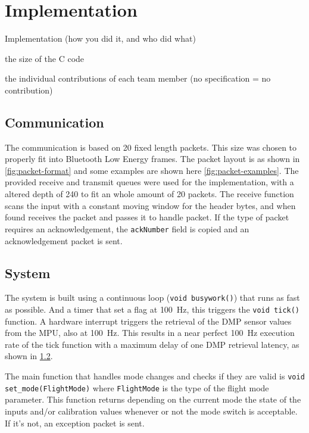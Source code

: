 \documentclass[final]{article}
\begin{document}
\section{Implementation}
\label{sec:implmentation}
Implementation (how you did it, and who did what)

the size of the C code

the individual contributions of each team member (no specification = no contribution)


\subsection{Communication}
The communication is based on \SI{20}{\byte} fixed length packets.
This size was chosen to properly fit into Bluetooth Low Energy frames.
The packet layout is as shown in \cref{fig:packet-format} and some examples are shown here \cref{fig:packet-examples}. %
The provided receive and transmit queues were used for the implementation, with a altered depth of \num{240} to fit an whole amount of \SI{20}{\byte} packets.
The receive function scans the input with a constant moving window for the header bytes, and when found receives the packet and passes it to handle packet.
If the type of packet requires an acknowledgement, the \texttt{ackNumber} field is copied and an acknowledgement packet is sent.


\subsection{System}
The system is built using a continuous loop (\texttt{void busywork()}) that runs as fast as possible.
And a timer that set a flag at \SI{100}{\hertz}, this triggers the \texttt{void tick()} function.
A hardware interrupt triggers the retrieval of the DMP sensor values from the MPU, also at \SI{100}{\hertz}.
This results in a near perfect \SI{100}{\hertz} execution rate of the tick function with a maximum delay of one DMP retrieval latency, as shown in \cref{}. %

The main function that handles mode changes and checks if they are valid is \texttt{void set\_mode(FlightMode)} where \texttt{FlightMode} is the type of the flight mode parameter.
This function returns depending on the current mode the state of the inputs and/or calibration values whenever or not the mode switch is acceptable.
If it's not, an exception packet is sent.
\end{document}
